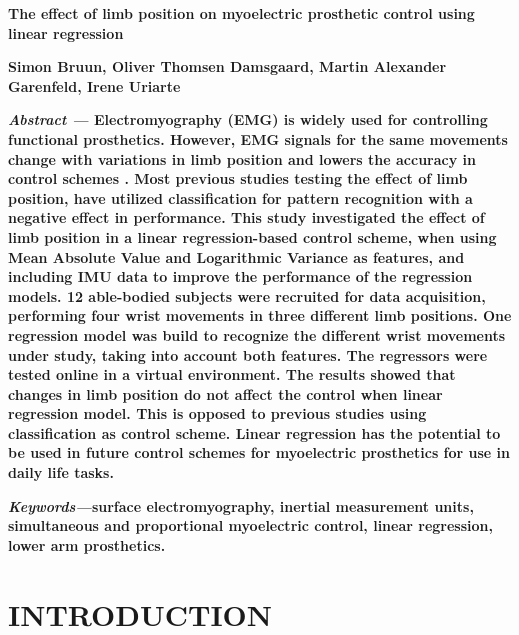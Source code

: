 %
		
\begin{center}	
	{\huge\textbf{The effect of limb position on myoelectric prosthetic control using linear regression}}
	
	
	{\large \textbf{Simon Bruun, Oliver Thomsen Damsgaard, Martin Alexander Garenfeld, Irene Uriarte}}
\end{center}
	
	\begin{multicols}{2}


%		
\textbf{\textit{Abstract ---} Electromyography (EMG) is widely used for controlling functional prosthetics. However, EMG signals for the same movements change with variations in limb position and lowers the accuracy in control schemes \cite{Fougner2012}. Most previous studies testing the effect of limb position, have utilized classification for pattern recognition with a negative effect in performance. This study investigated the effect of limb position in a linear regression-based control scheme, when using Mean Absolute Value and Logarithmic Variance as features, and including IMU data to improve the performance of the regression models. 12 able-bodied subjects were recruited for data acquisition, performing four wrist movements in three different limb positions. One regression model was build to recognize the different wrist movements under study, taking into account both features. The regressors were tested online in a virtual environment. The results showed that changes in limb position do not affect the control when linear regression model.
This is opposed to previous studies using classification as control scheme. Linear regression has the potential to be used in future control schemes for myoelectric prosthetics for use in daily life tasks.}

\textbf{\textit{Keywords---}surface electromyography, inertial measurement units, simultaneous and proportional myoelectric control, linear regression, lower arm prosthetics.}
	
	
\section*{INTRODUCTION}%
		

\end{multicols}
